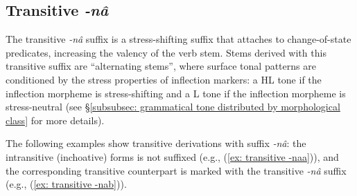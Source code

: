 

\subsection{Transitive \textit{-nâ}}
\label{subsec: transitive -na}

The transitive \textit{-nâ} suffix is a stress-shifting suffix that attaches to change-of-state predicates, increasing the valency of the verb stem. Stems derived with this transitive suffix are ``alternating stems'', where surface tonal patterns are conditioned by the stress properties of inflection markers: a HL tone if the inflection morpheme is stress-shifting and a L tone if the inflection morpheme is stress-neutral (see §\ref{subsubsec: grammatical tone distributed by morphological class} for more details).

The following examples show transitive derivations with suffix \textit{-nâ}: the intransitive (inchoative) forms is not suffixed (e.g., (\ref{ex: transitive -naa})), and the corresponding transitive counterpart is marked with the transitive \textit{-nâ} suffix (e.g., (\ref{ex: transitive -nab})).

\ea\label{ex: transitive -na}

    \label{ex: transitive -naa}
        \label{ex: transitive -nab}
    \z
\z

